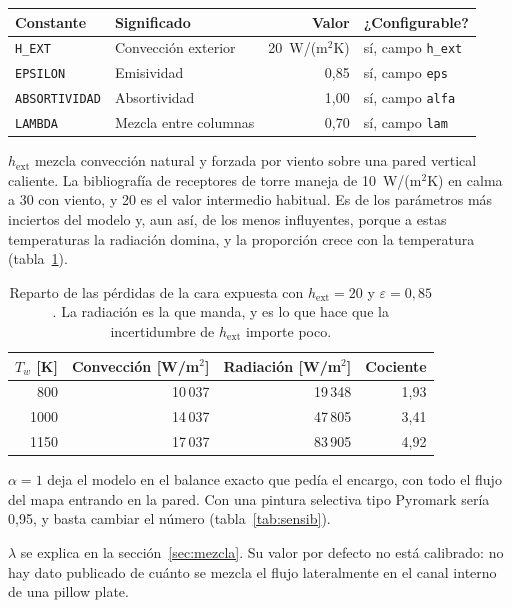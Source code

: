 \documentclass[11pt,a4paper]{article}
\begin{document}
\begin{center}
\begin{tabular}{llrl}
  \toprule
  Constante & Significado & Valor & ¿Configurable? \\
  \midrule
  \texttt{H\_EXT}        & Convección exterior      & 20~W/(m$^2$K) & sí, campo \texttt{h\_ext} \\
  \texttt{EPSILON}       & Emisividad               & 0,85          & sí, campo \texttt{eps} \\
  \texttt{ABSORTIVIDAD}  & Absortividad             & 1,00          & sí, campo \texttt{alfa} \\
  \texttt{LAMBDA}        & Mezcla entre columnas    & 0,70          & sí, campo \texttt{lam} \\
  \bottomrule
\end{tabular}
\end{center}

$h_{\mathrm{ext}}$ mezcla convección natural y forzada por viento sobre una pared
vertical caliente. La bibliografía de receptores de torre maneja de 10~W/(m$^2$K)
en calma a 30 con viento, y 20 es el valor intermedio habitual. Es de los
parámetros más inciertos del modelo y, aun así, de los menos influyentes, porque
a estas temperaturas la radiación domina, y la proporción crece con la
temperatura (tabla~\ref{tab:radconv}).

\begin{table}[h]
\centering
\begin{tabular}{rrrr}
  \toprule
  $T_w$ [K] & Convección [W/m$^2$] & Radiación [W/m$^2$] & Cociente \\
  \midrule
   800 & 10\,037 & 19\,348 & 1,93 \\
  1000 & 14\,037 & 47\,805 & 3,41 \\
  1150 & 17\,037 & 83\,905 & 4,92 \\
  \bottomrule
\end{tabular}
\caption{Reparto de las pérdidas de la cara expuesta con $h_{\mathrm{ext}} = 20$
y $\varepsilon = 0{,}85$. La radiación es la que manda, y es lo que hace que la
incertidumbre de $h_{\mathrm{ext}}$ importe poco.}
\label{tab:radconv}
\end{table}

$\alpha = 1$ deja el modelo en el balance exacto que pedía el encargo, con todo
el flujo del mapa entrando en la pared. Con una pintura selectiva tipo Pyromark
sería 0,95, y basta cambiar el número (tabla~\ref{tab:sensib}).

$\lambda$ se explica en la sección~\ref{sec:mezcla}. Su valor por defecto no está
calibrado: no hay dato publicado de cuánto se mezcla el flujo lateralmente en el
canal interno de una pillow plate.
\end{document}
